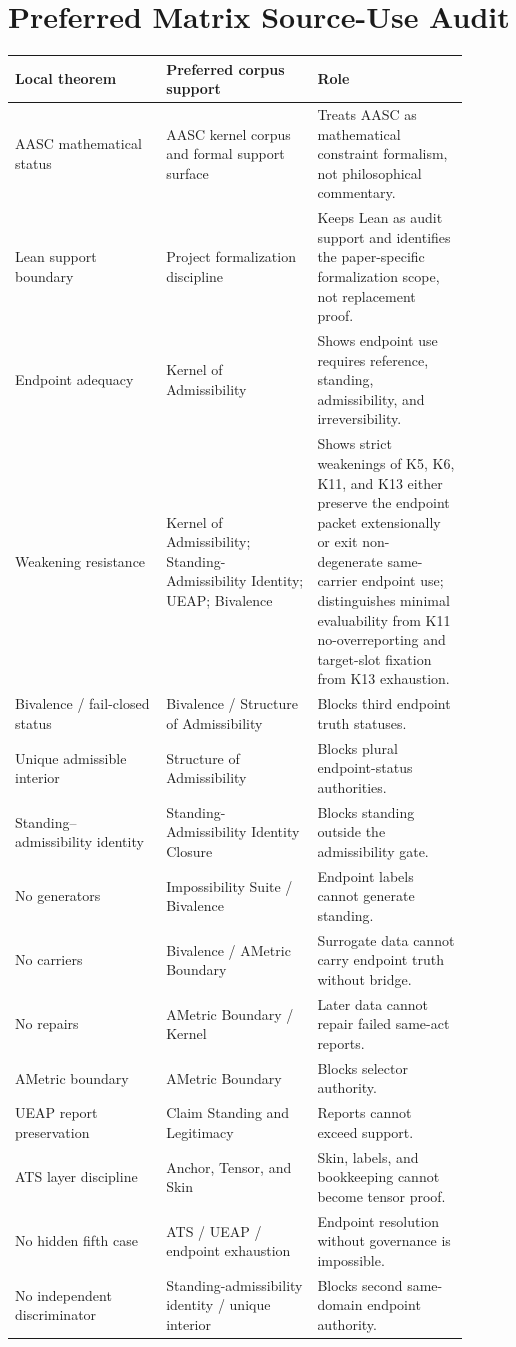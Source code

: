 \documentclass[11pt]{article}
\begin{document}
\section{Preferred Matrix Source-Use Audit}
\begin{longtable}{L{0.30\linewidth}L{0.30\linewidth}L{0.30\linewidth}}
\toprule
\textbf{Local theorem} & \textbf{Preferred corpus support} & \textbf{Role}\\
\midrule
AASC mathematical status & AASC kernel corpus and formal support surface & Treats AASC as mathematical constraint formalism, not philosophical commentary.\\
Lean support boundary & Project formalization discipline & Keeps Lean as audit support and identifies the paper-specific formalization scope, not replacement proof.\\
Endpoint adequacy & Kernel of Admissibility & Shows endpoint use requires reference, standing, admissibility, and irreversibility.\\
Weakening resistance & Kernel of Admissibility; Standing-Admissibility Identity; UEAP; Bivalence & Shows strict weakenings of K5, K6, K11, and K13 either preserve the endpoint packet extensionally or exit non-degenerate same-carrier endpoint use; distinguishes minimal evaluability from K11 no-overreporting and target-slot fixation from K13 exhaustion.\\
Bivalence / fail-closed status & Bivalence / Structure of Admissibility & Blocks third endpoint truth statuses.\\
Unique admissible interior & Structure of Admissibility & Blocks plural endpoint-status authorities.\\
Standing--admissibility identity & Standing-Admissibility Identity Closure & Blocks standing outside the admissibility gate.\\
No generators & Impossibility Suite / Bivalence & Endpoint labels cannot generate standing.\\
No carriers & Bivalence / AMetric Boundary & Surrogate data cannot carry endpoint truth without bridge.\\
No repairs & AMetric Boundary / Kernel & Later data cannot repair failed same-act reports.\\
AMetric boundary & AMetric Boundary & Blocks selector authority.\\
UEAP report preservation & Claim Standing and Legitimacy & Reports cannot exceed support.\\
ATS layer discipline & Anchor, Tensor, and Skin & Skin, labels, and bookkeeping cannot become tensor proof.\\
No hidden fifth case & ATS / UEAP / endpoint exhaustion & Endpoint resolution without governance is impossible.\\
No independent discriminator & Standing-admissibility identity / unique interior & Blocks second same-domain endpoint authority.\\
\bottomrule
\end{longtable}
\end{document}
